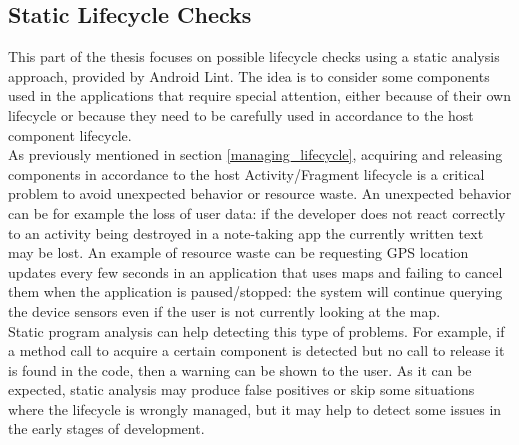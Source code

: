 \documentclass[11pt,a4paper,notitlepage]{article}
\begin{document}
\subsection{Static Lifecycle Checks}
This part of the thesis focuses on possible lifecycle checks using a static analysis approach, provided by Android Lint. The idea is to consider some components used in the applications that require special attention, either because of their own lifecycle or because they need to be carefully used in accordance to the host component lifecycle.\medskip \\
As previously mentioned in section \ref{managing_lifecycle}, acquiring and releasing components in accordance to the host Activity/Fragment lifecycle is a critical problem to avoid unexpected behavior or resource waste. An unexpected behavior can be for example the loss of user data: if the developer does not react correctly to an activity being destroyed in a note-taking app the currently written text may be lost. An example of resource waste can be requesting GPS location updates every few seconds in an application that uses maps and failing to cancel them when the application is paused/stopped: the system will continue querying the device sensors even if the user is not currently looking at the map.\bigskip \\
Static program analysis can help detecting this type of problems. For example, if a method call to acquire a certain component is detected but no call to release it is found in the code, then a warning can be shown to the user. As it can be expected, static analysis may produce false positives or skip some situations where the lifecycle is wrongly managed, but it may help to detect some issues in the early stages of development.
\end{document}
